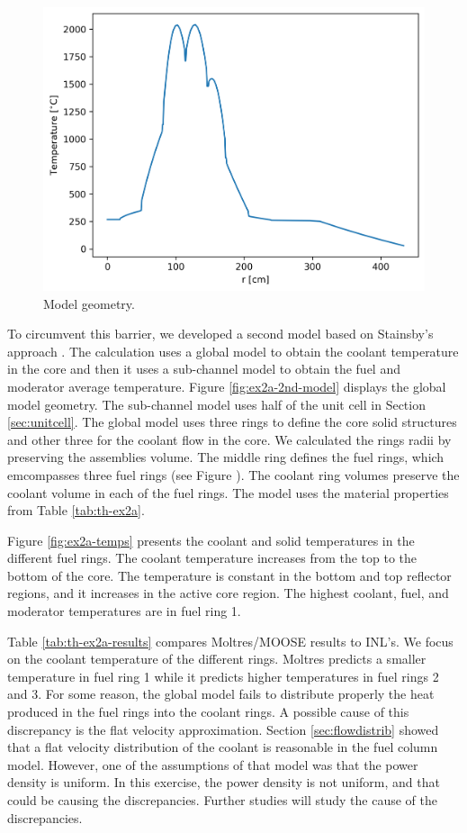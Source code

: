 \begin{figure}[htbp!]
  \centering
  \includegraphics[width=0.35\linewidth]{figures-thermal/ex2a-across}
  \hfill
  \caption{Model geometry.}
  \label{fig:ex2a-1st-model-across}
\end{figure}

To circumvent this barrier, we developed a second model based on Stainsby's approach \cite{stainsby_investigation_2008}.
The calculation uses a global model to obtain the coolant temperature in the core and then it uses a sub-channel model to obtain the fuel and moderator average temperature.
Figure \ref{fig:ex2a-2nd-model} displays the global model geometry.
The sub-channel model uses half of the unit cell in Section \ref{sec:unitcell}.
The global model uses three rings to define the core solid structures and other three for the coolant flow in the core.
We calculated the rings radii by preserving the assemblies volume.
The middle ring defines the fuel rings, which emcompasses three fuel rings (see Figure \cite{oecd_nea_benchmark_2017}).
The coolant ring volumes preserve the coolant volume in each of the fuel rings.
The model uses the material properties from Table \ref{tab:th-ex2a}.

Figure \ref{fig:ex2a-temps} presents the coolant and solid temperatures in the different fuel rings.
The coolant temperature increases from the top to the bottom of the core.
The temperature is constant in the bottom and top reflector regions, and it increases in the active core region.
The highest coolant, fuel, and moderator temperatures are in fuel ring 1.

Table \ref{tab:th-ex2a-results} compares Moltres/MOOSE results to INL's.
We focus on the coolant temperature of the different rings.
Moltres predicts a smaller temperature in fuel ring 1 while it predicts higher temperatures in fuel rings 2 and 3.
For some reason, the global model fails to distribute properly the heat produced in the fuel rings into the coolant rings.
A possible cause of this discrepancy is the flat velocity approximation.
Section \ref{sec:flowdistrib} showed that a flat velocity distribution of the coolant is reasonable in the fuel column model.
However, one of the assumptions of that model was that the power density is uniform.
In this exercise, the power density is not uniform, and that could be causing the discrepancies.
Further studies will study the cause of the discrepancies.


